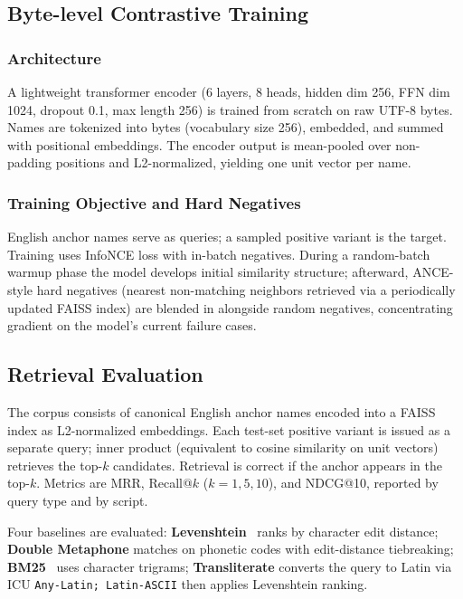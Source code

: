 \documentclass[sigconf]{acmart}
\begin{document}
\subsection{Byte-level Contrastive Training}
\subsubsection{Architecture}
\label{sec:contrastive_objective}
A lightweight transformer encoder (6 layers, 8 heads, hidden dim 256, FFN dim 1024, dropout 0.1, max length 256) is trained from scratch on raw UTF-8 bytes. Names are tokenized into bytes (vocabulary size 256), embedded, and summed with positional embeddings. The encoder output is mean-pooled over non-padding positions and L2-normalized, yielding one unit vector per name.

\subsubsection{Training Objective and Hard Negatives}
\label{sec:hard_negative_mining}
English anchor names serve as queries; a sampled positive variant is the target. Training uses InfoNCE loss with in-batch negatives. During a random-batch warmup phase the model develops initial similarity structure; afterward, ANCE-style hard negatives (nearest non-matching neighbors retrieved via a periodically updated FAISS index) are blended in alongside random negatives, concentrating gradient on the model's current failure cases.

\subsection{Retrieval Evaluation}
The corpus consists of canonical English anchor names encoded into a FAISS index as L2-normalized embeddings. Each test-set positive variant is issued as a separate query; inner product (equivalent to cosine similarity on unit vectors) retrieves the top-$k$ candidates. Retrieval is correct if the anchor appears in the top-$k$. Metrics are MRR, Recall@$k$ ($k\!=\!1,5,10$), and NDCG@10, reported by query type and by script.

Four baselines are evaluated: \textbf{Levenshtein}~\cite{levenshtein1966binary,navarro2001guided} ranks by character edit distance; \textbf{Double Metaphone} matches on phonetic codes with edit-distance tiebreaking; \textbf{BM25}~\cite{robertson2009bm25} uses character trigrams; \textbf{Transliterate} converts the query to Latin via ICU \texttt{Any-Latin; Latin-ASCII} then applies Levenshtein ranking.
\end{document}
